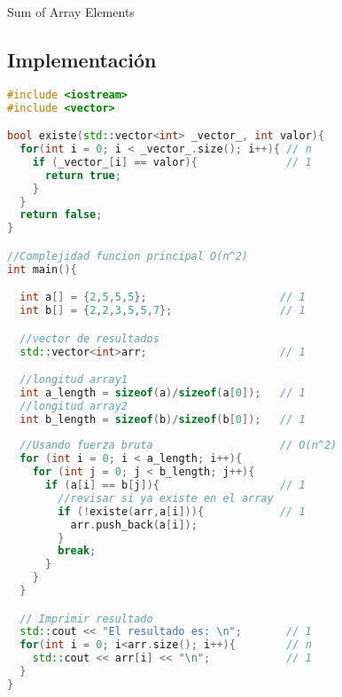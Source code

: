 \documentclass{article}
\begin{document}
\begin{center}
  \begin{minipage}{0.7\linewidth} %
    \begin{algorithm}[H] 
      \DontPrintSemicolon
      \caption{Sum of Array Elements}
      \label{alg:loop}
      \BlankLine
    \end{algorithm}
  \end{minipage}
\end{center}


\newpage
\subsection{Implementación}

\begin{file}
\begin{lstlisting}[language=C++]
#include <iostream>
#include <vector>

bool existe(std::vector<int> _vector_, int valor){
  for(int i = 0; i < _vector_.size(); i++){ // n
    if (_vector_[i] == valor){              // 1
      return true;
    }
  }
  return false;
}

//Complejidad funcion principal O(n^2)
int main(){

  int a[] = {2,5,5,5};                     // 1
  int b[] = {2,2,3,5,5,7};                 // 1

  //vector de resultados
  std::vector<int>arr;                     // 1

  //longitud array1
  int a_length = sizeof(a)/sizeof(a[0]);   // 1
  //longitud array2
  int b_length = sizeof(b)/sizeof(b[0]);   // 1
  
  //Usando fuerza bruta                    // O(n^2)
  for (int i = 0; i < a_length; i++){      
    for (int j = 0; j < b_length; j++){    
      if (a[i] == b[j]){                   // 1
        //revisar si ya existe en el array
        if (!existe(arr,a[i])){            // 1
          arr.push_back(a[i]);
        }
        break;
      }
    }
  }

  // Imprimir resultado
  std::cout << "El resultado es: \n";       // 1
  for(int i = 0; i<arr.size(); i++){        // n
    std::cout << arr[i] << "\n";            // 1
  } 
}
\end{lstlisting}
\end{file}
\end{document}
